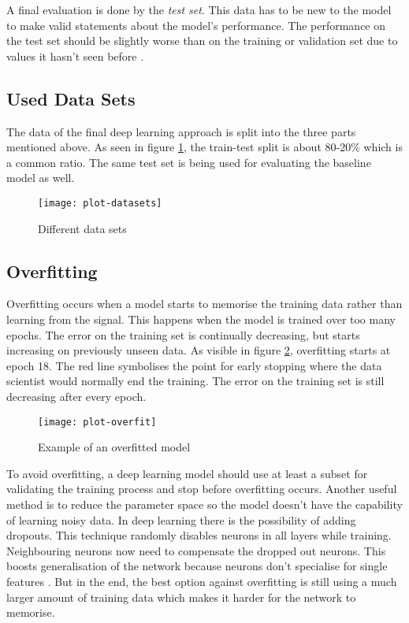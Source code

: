 A final evaluation is done by the \emph{test set}. This data has to be new to the model to make valid statements about the model's performance. The performance on the test set should be slightly worse than on the training or validation set due to values it hasn't seen before \cite{shah17}.

\subsection{Used Data Sets}

The data of the final deep learning approach is split into the three parts mentioned above. As seen in figure \ref{fig:datasets}, the train-test split is about 80-20\% which is a common ratio. The same test set is being used for evaluating the baseline model as well.

\begin{figure}[!ht]
    \centering
    \texttt{[image: plot-datasets]}
    \caption{Different data sets}
    \label{fig:datasets}
\end{figure}

\subsection{Overfitting}
\label{chap:overfitting}

Overfitting occurs when a model starts to memorise the training data rather than learning from the signal. This happens when the model is trained over too many epochs. The error on the training set is continually decreasing, but starts increasing on previously unseen data. As visible in figure \ref{fig:overfit}, overfitting starts at epoch 18. The red line symbolises the point for early stopping where the data scientist would normally end the training. The error on the training set is still decreasing after every epoch.

\begin{figure}[!ht]
    \centering
    \texttt{[image: plot-overfit]}
    \caption{Example of an overfitted model}
    \label{fig:overfit}
\end{figure}

To avoid overfitting, a deep learning model should use at least a subset for validating the training process and stop before overfitting occurs. Another useful method is to reduce the parameter space so the model doesn't have the capability of learning noisy data. In deep learning there is the possibility of adding dropouts. This technique randomly disables neurons in all layers while training. Neighbouring neurons now need to compensate the dropped out neurons. This boosts generalisation of the network because neurons don't specialise for single features \cite{drop14}. But in the end, the best option against overfitting is still using a much larger amount of training data which makes it harder for the network to memorise.

